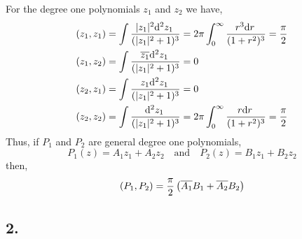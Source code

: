 \documentclass[12pt]{article}
\begin{document}
For the degree one polynomials $z_1$ and $z_2$ we have,
\begin{align*}
(z_1, z_1) & = \int \frac{|z_1|^2 \mathrm{d}^{2} z_1 \:}{(|z_1|^2 + 1)^{3}} = 2 \pi \int_0^\infty \frac{r^3 \mathrm{d}r \:}{(1 + r^2)^3} = \frac{\pi}{2}
\\
(z_1, z_2) & = \int \frac{\overline{z_1} \mathrm{d}^{2} z_1 \:}{(|z_1|^2 + 1)^{3}}  = 0
\\
(z_2, z_1) & = \int \frac{z_1 \mathrm{d}^{2} z_1 \:}{(|z_1|^2 + 1)^{3}}  = 0
\\
(z_2, z_2) & = \int \frac{\mathrm{d}^{2} z_1 \:}{(|z_1|^2 + 1)^{3}} = 2 \pi \int_0^\infty \frac{r \mathrm{d}r \:}{(1 + r^2)^3} = \frac{\pi}{2}
\end{align*}
Thus, if $P_1$ and $P_2$ are general degree one polynomials,
\[ P_1(z) = A_1 z_1 + A_2 z_2 \quad \text{and} \quad P_2(z) = B_1 z_1 + B_2 z_2 \]
then,
\[ (P_1, P_2) = \frac{\pi}{2} \left( \overline{A_1} B_1 + \overline{A_2} B_2 \right) \]

\subsection*{2.}
\end{document}
